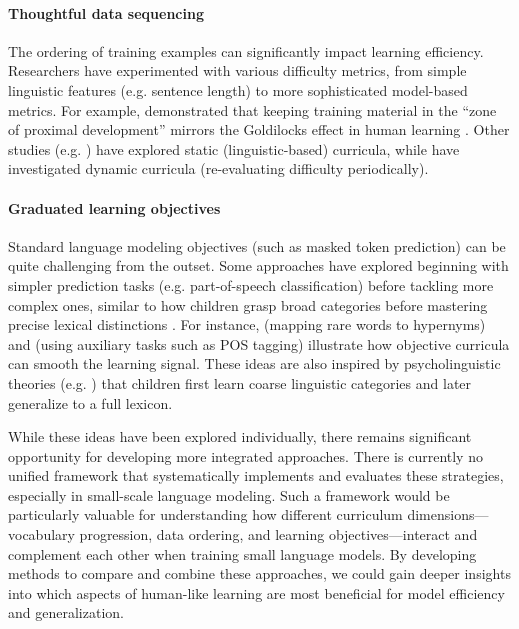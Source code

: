 \paragraph{Thoughtful data sequencing} The ordering of training examples can significantly impact learning efficiency. Researchers have experimented with various difficulty metrics, from simple linguistic features (e.g. sentence length) to more sophisticated model-based metrics. For example, \citet{platanios2019competence} demonstrated that keeping training material in the “zone of proximal development” mirrors the Goldilocks effect in human learning \citep{kidd2012goldilocks}. Other studies (e.g. \citet{campos2021curriculum, kocmi2017curriculum, liu2018curriculum}) have explored static (linguistic-based) curricula, while \citet{sachan2016easy, lalor2020dynamic} have investigated dynamic curricula (re-evaluating difficulty periodically).

\paragraph{Graduated learning objectives} Standard language modeling objectives (such as masked token prediction) can be quite challenging from the outset. Some approaches have explored beginning with simpler prediction tasks (e.g. part-of-speech classification) before tackling more complex ones, similar to how children grasp broad categories before mastering precise lexical distinctions \citep{markman1990constraints}. For instance, \citet{bai2022better} (mapping rare words to hypernyms) and \citet{wang2023language, cui2022lert} (using auxiliary tasks such as POS tagging) illustrate how objective curricula can smooth the learning signal. These ideas are also inspired by psycholinguistic theories (e.g. \citet{alishahi2010computational, gleitman1990structural}) that children first learn coarse linguistic categories and later generalize to a full lexicon.

While these ideas have been explored individually, there remains significant opportunity for developing more integrated approaches. There is currently no unified framework that systematically implements and evaluates these strategies, especially in small-scale language modeling. Such a framework would be particularly valuable for understanding how different curriculum dimensions—vocabulary progression, data ordering, and learning objectives—interact and complement each other when training small language models. By developing methods to compare and combine these approaches, we could gain deeper insights into which aspects of human-like learning are most beneficial for model efficiency and generalization.

